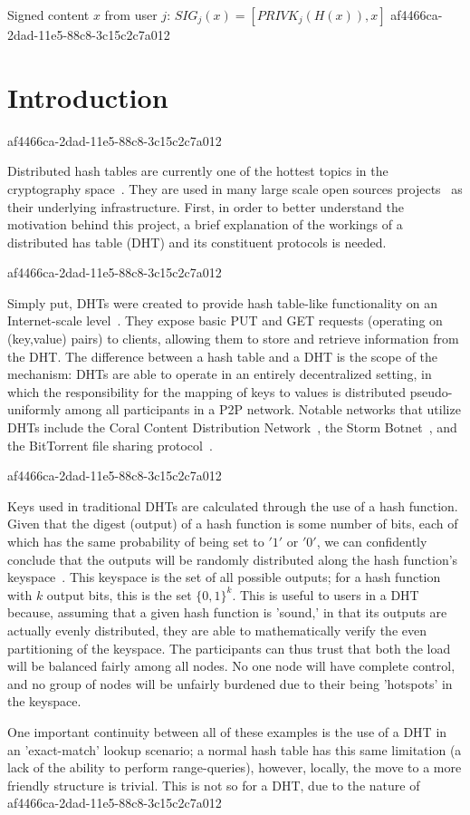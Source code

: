 \documentclass[12pt]{article}
\begin{document}
Signed content $x$ from user $j$: $SIG_j(x) = \left[ PRIVK_j( H(x) ), x \right]$
af4466ca-2dad-11e5-88c8-3c15c2c7a012
\section{Introduction}
af4466ca-2dad-11e5-88c8-3c15c2c7a012\par Distributed hash tables are currently one of the hottest topics in the cryptography space~\cite{Stoica:2001dj,Rowstron:2001ea,Ratnasamy:2001wn}. They are used in many large scale open sources projects~\cite{Freitas:2013tb,Xu:2010vs,Perfitt:2010fh} as their underlying infrastructure. First, in order to better understand the motivation behind this project, a brief explanation of the workings of a distributed has table (DHT) and its constituent protocols is needed.

af4466ca-2dad-11e5-88c8-3c15c2c7a012\par Simply put, DHTs were created to provide hash table-like functionality on an Internet-scale level~\cite{Ratnasamy:2001wn}. They expose basic PUT and GET requests (operating on (key,value) pairs) to clients, allowing them to store and retrieve information from the DHT. The difference between a hash table and a DHT is the scope of the mechanism: DHTs are able to operate in an entirely decentralized setting, in which the responsibility for the mapping of keys to values is distributed pseudo-uniformly among all participants in a P2P network. Notable networks that utilize DHTs include the Coral Content Distribution Network~\cite{Freedman:2004vb}, the Storm Botnet~\cite{Holz:2008uk}, and the BitTorrent file sharing protocol~\cite{Cohen:y1_8mBnw}.

af4466ca-2dad-11e5-88c8-3c15c2c7a012\par Keys used in traditional DHTs are calculated through the use of a hash function. Given that the digest (output) of a hash function is some number of bits, each of which has the same probability of being set to $'1'$ or $'0'$, we can confidently conclude that the outputs will be randomly distributed along the hash function's keyspace~. This keyspace is the set of all possible outputs; for a hash function with $k$ output bits, this is the set $\{0,1\}^k$. This is useful to users in a DHT because, assuming that a given hash function is 'sound,' in that its outputs are actually evenly distributed, they are able to mathematically verify the even partitioning of the keyspace. The participants can thus trust that both the load will be balanced fairly among all nodes. No one node will have complete control, and no group of nodes will be unfairly burdened due to their being 'hotspots' in the keyspace.~

\par One important continuity between all of these examples is the use of a DHT in an 'exact-match' lookup scenario; a normal hash table has this same limitation (a lack of the ability to perform range-queries), however, locally, the move to a more friendly structure is trivial. This is not so for a DHT, due to the nature of
\printbibliography
af4466ca-2dad-11e5-88c8-3c15c2c7a012
\end{document}
